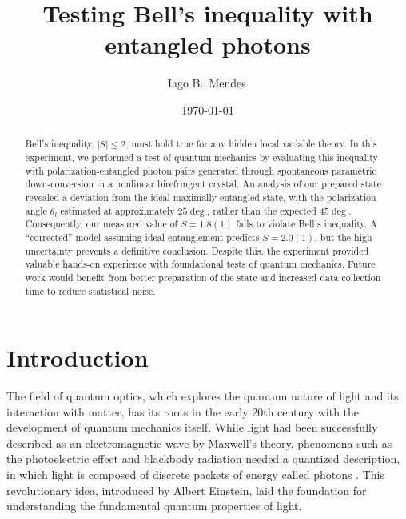 \documentclass{../paper}
\begin{document}
\title{Testing Bell's inequality with entangled photons}

\author{Iago B.~Mendes\,}

\date{\today}

\begin{abstract}
  Bell's inequality, $|S| \leq 2$, must hold true for any hidden local variable theory. In this experiment, we performed a test of quantum mechanics by evaluating this inequality with polarization-entangled photon pairs generated through spontaneous parametric down-conversion in a nonlinear birefringent crystal. An analysis of our prepared state revealed a deviation from the ideal maximally entangled state, with the polarization angle $\theta_l$ estimated at approximately $25\deg$, rather than the expected $45\deg$. Consequently, our measured value of $S = 1.8(1)$ fails to violate Bell's inequality. A ``corrected'' model assuming ideal entanglement predicts $S = 2.0(1)$, but the high uncertainty prevents a definitive conclusion. Despite this, the experiment provided valuable hands-on experience with foundational tests of quantum mechanics. Future work would benefit from better preparation of the state and increased data collection time to reduce statistical noise.
\end{abstract}

\maketitle

\section{Introduction}

The field of quantum optics, which explores the quantum nature of light and its interaction with matter, has its roots in the early 20th century with the development of quantum mechanics itself. While light had been successfully described as an electromagnetic wave by Maxwell's theory, phenomena such as the photoelectric effect and blackbody radiation needed a quantized description, in which light is composed of discrete packets of energy called photons \cite{Einstein1905}. This revolutionary idea, introduced by Albert Einstein, laid the foundation for understanding the fundamental quantum properties of light.
\end{document}
